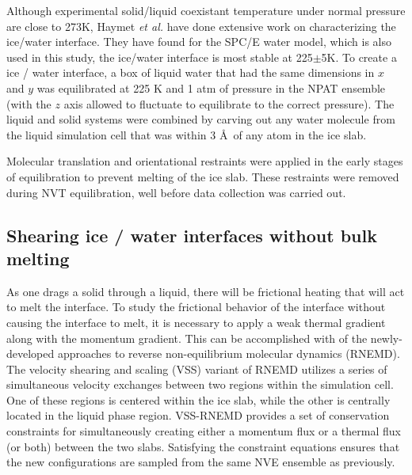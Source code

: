 \documentclass[journal = jpccck, manuscript = article]{achemso}
\begin{document}
Although experimental solid/liquid coexistant temperature under normal
pressure are close to 273K, Haymet \emph{et al.} have done extensive
work on characterizing the ice/water
interface.\cite{Karim88,Karim90,Hayward01,Bryk02,Hayward02} They have
found for the SPC/E water model,\cite{Berendsen87} which is also used
in this study, the ice/water interface is most stable at
225$\pm$5K.\cite{Bryk02} To create a ice / water interface, a box of
liquid water that had the same dimensions in $x$ and $y$ was
equilibrated at 225 K and 1 atm of pressure in the NPAT ensemble (with
the $z$ axis allowed to fluctuate to equilibrate to the correct
pressure).  The liquid and solid systems were combined by carving out
any water molecule from the liquid simulation cell that was within 3
\AA\ of any atom in the ice slab.

Molecular translation and orientational restraints were applied in the
early stages of equilibration to prevent melting of the ice slab.
These restraints were removed during NVT equilibration, well before
data collection was carried out.

\subsection{Shearing ice / water interfaces without bulk melting}

As one drags a solid through a liquid, there will be frictional
heating that will act to melt the interface.  To study the frictional
behavior of the interface without causing the interface to melt, it is
necessary to apply a weak thermal gradient along with the momentum
gradient.  This can be accomplished with of the newly-developed
approaches to reverse non-equilibrium molecular dynamics (RNEMD).  The
velocity shearing and scaling (VSS) variant of RNEMD utilizes a series
of simultaneous velocity exchanges between two regions within the
simulation cell.\cite{Kuang12} One of these regions is centered within
the ice slab, while the other is centrally located in the liquid phase
region. VSS-RNEMD provides a set of conservation constraints for
simultaneously creating either a momentum flux or a thermal flux (or
both) between the two slabs.  Satisfying the constraint equations
ensures that the new configurations are sampled from the same NVE
ensemble as previously.
\end{document}
